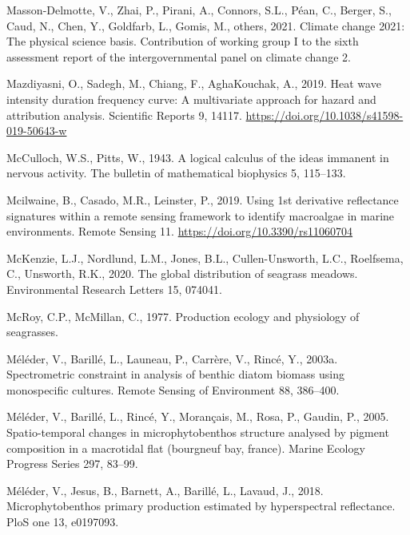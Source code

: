 \documentclass[
  letterpaper,
  11pt,
  english,
  singlespacing,
  headsepline]{MastersDoctoralThesis}
\newlength{\cslhangindent}
\newenvironment{CSLReferences}[2] %
 {\begin{list}{}{%
  \setlength{\itemindent}{0pt}
  \setlength{\leftmargin}{0pt}
  \setlength{\parsep}{0pt}
  \ifodd #1
   \setlength{\leftmargin}{\cslhangindent}
   \setlength{\itemindent}{-1\cslhangindent}
  \fi
  \setlength{\itemsep}{#2\baselineskip}}}
 {\end{list}}
\begin{document}
\begin{CSLReferences}{1}{0}
Masson-Delmotte, V., Zhai, P., Pirani, A., Connors, S.L., Péan, C.,
Berger, S., Caud, N., Chen, Y., Goldfarb, L., Gomis, M., others, 2021.
Climate change 2021: The physical science basis. Contribution of working
group I to the sixth assessment report of the intergovernmental panel on
climate change 2.

Mazdiyasni, O., Sadegh, M., Chiang, F., AghaKouchak, A., 2019. Heat wave
intensity duration frequency curve: A multivariate approach for hazard
and attribution analysis. Scientific Reports 9, 14117.
\url{https://doi.org/10.1038/s41598-019-50643-w}

McCulloch, W.S., Pitts, W., 1943. A logical calculus of the ideas
immanent in nervous activity. The bulletin of mathematical biophysics 5,
115--133.

Mcilwaine, B., Casado, M.R., Leinster, P., 2019. Using 1st derivative
reflectance signatures within a remote sensing framework to identify
macroalgae in marine environments. Remote Sensing 11.
\url{https://doi.org/10.3390/rs11060704}

McKenzie, L.J., Nordlund, L.M., Jones, B.L., Cullen-Unsworth, L.C.,
Roelfsema, C., Unsworth, R.K., 2020. The global distribution of seagrass
meadows. Environmental Research Letters 15, 074041.

McRoy, C.P., McMillan, C., 1977. Production ecology and physiology of
seagrasses.

Méléder, V., Barillé, L., Launeau, P., Carrère, V., Rincé, Y., 2003a.
Spectrometric constraint in analysis of benthic diatom biomass using
monospecific cultures. Remote Sensing of Environment 88, 386--400.

Méléder, V., Barillé, L., Rincé, Y., Morançais, M., Rosa, P., Gaudin,
P., 2005. Spatio-temporal changes in microphytobenthos structure
analysed by pigment composition in a macrotidal flat (bourgneuf bay,
france). Marine Ecology Progress Series 297, 83--99.

Méléder, V., Jesus, B., Barnett, A., Barillé, L., Lavaud, J., 2018.
Microphytobenthos primary production estimated by hyperspectral
reflectance. PloS one 13, e0197093.


\end{CSLReferences}
\end{document}
